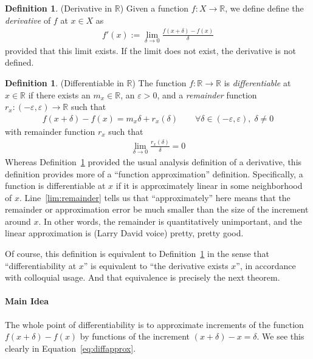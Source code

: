 \documentclass[12pt]{book}
\numberwithin{equation}{section} %
\theoremstyle{plain}
\theoremstyle{definition}
\newtheorem{defn}[thm]{Definition}
\theoremstyle{remark}
\newcommand{\R}{\mathbb{R}}
\begin{document}
\begin{defn}{(Derivative in $\R$)}
\label{defn:derivative}
Given a function $f:X\rightarrow\R$, we define define the
\emph{derivative} of $f$ at $x\in X$ as
\begin{align*}
  f'(x) := \lim_{\delta\rightarrow0}
  \frac{f(x+\delta)-f(x)}{\delta}
\end{align*}
provided that this limit exists. If the limit does not exist, the
derivative is not defined.
\end{defn}

\begin{defn}{(Differentiable in $\R$)}
\label{defn:diffable}
The function $f:\R\rightarrow\R$ is \emph{differentiable} at $x\in\R$ if
there exists an $m_x\in\R$, an $\varepsilon>0$, and a \emph{remainder}
function $r_x:(-\varepsilon,\varepsilon)\rightarrow\R$ such that
\begin{align}
  \label{eq:diffapprox}
  f(x+\delta)-f(x) = m_x \delta + r_x(\delta)
  \qquad \forall \delta\in(-\varepsilon,\varepsilon), \; \delta \neq 0
\end{align}
with remainder function $r_x$ such that
\begin{align}
  \label{lim:remainder}
  \lim_{\delta\rightarrow 0}
  \frac{r_x(\delta)}{\delta}=0
\end{align}
Whereas Definition~\ref{defn:derivative} provided the usual analysis
definition of a derivative, this definition provides more of a
``function approximation'' definition. Specifically, a function is
differentiable at $x$ if it is approximately linear in some neighborhood
of $x$.  Line~\ref{lim:remainder} tells us that ``approximately'' here
means that the remainder or approximation error be much smaller than
the size of the increment around $x$. In other words, the remainder is
quantitatively unimportant, and the linear approximation is (Larry David
voice) pretty, pretty good.

Of course, this definition is equivalent to
Definition~\ref{defn:derivative} in the sense that ``differentiability
at $x$'' is equivalent to ``the derivative exists $x$'', in accordance
with colloquial usage. And that equivalence is precisely the next
theorem.
\end{defn}

\paragraph{Main Idea} The whole point of differentiability is to
approximate increments of the function $f(x+\delta)-f(x)$ by functions
of the increment $(x+\delta)-x=\delta$. We see this clearly in
Equation~\ref{eq:diffapprox}.
\end{document}
